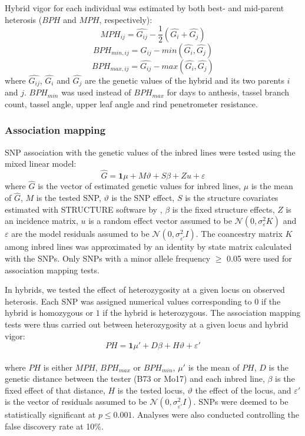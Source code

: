 \documentclass[12pt]{article}
\begin{document}
Hybrid vigor for each individual was estimated by both best- and mid-parent heterosis ($BPH$ and $MPH$, respectively):
%
\[ MPH_{ij}=\hat{G_{ij}}-\frac{1}{2}(\hat{G_{i}}+\hat{G_{j}}) \]
\[ BPH_{min,ij}=\hat{G_{ij}}-min(\hat{G_{i}} ,\hat{G_{j}}) \] 
\[ BPH_{max,ij}=\hat{G_{ij}}-max(\hat{G_{i}} ,\hat{G_{j}}) \]
%
where $\hat{G_{ij}}$, $\hat{G_{i}}$ and $\hat{G_{j}}$ are the genetic values of the hybrid and its two parents $i$ and $j$. $BPH_{min}$ was used instead of $BPH_{max}$ for days to anthesis, tassel branch count, tassel angle, upper leaf angle and rind penetrometer resistance.

\subsubsection*{Association mapping}

SNP association with the genetic values of the inbred lines were tested using the mixed linear model:
%
\[\hat{G}=\mathbf{1}\mu + M\vartheta +S\beta +Zu+\varepsilon\]
%
where $\hat{G}$ is the vector of estimated genetic values for inbred lines, $\mu$ is the mean of $\hat{G}$, $M$ is the tested SNP, $\vartheta$ is the SNP effect, $S$ is the structure covariates estimated  with STRUCTURE software \citep{Pritchard2000} by \citet{Flint-Garcia2005}, $\beta$ is the fixed structure effects, $Z$ is an incidence matrix, $u$ is a random effect vector assumed to be $\mathcal{N}(0,\sigma_{ {\varepsilon}}^{2}K)$ and $\varepsilon$ are the model residuals assumed to be $\mathcal{N}(0,\sigma_{ {\varepsilon}'}^{2}I)$. 
The coancestry matrix $K$ among inbred lines was approximated by an identity by state matrix calculated with the SNPs. Only SNPs with a minor allele frequency $\ge$ 0.05 were used for association mapping tests.

In hybrids, we tested the effect of heterozygosity at a given locus on observed heterosis. 
Each SNP was assigned numerical values corresponding to $0$ if the hybrid is homozygous or $1$ if the hybrid is heterozygous. 
The association mapping tests were thus carried out between heterozygosity at a given locus and hybrid vigor:
%
\[PH=\mathbf{1}{\mu}'+D\beta +H\vartheta +{\varepsilon }'\]  \\
%
where $PH$ is either $MPH$, $BPH_{max}$ or $BPH_{min}$, ${\mu}'$ is the mean of $PH$, $D$ is the genetic distance between the tester (B73 or Mo17) and each inbred line, $\beta$ is the fixed effect of that distance, $H$ is the tested locus, $\vartheta$ the effect of the locus, and ${\varepsilon }'$ is the vector of residuals assumed to be $\mathcal{N}(0,\sigma_{ {\varepsilon}'}^{2}I)$.  
SNPs were deemed to be statistically significant at $p\leq 0.001$. Analyses were also conducted controlling the false discovery rate \citep{Benjamini1995} at 10\%. 
\end{document}
